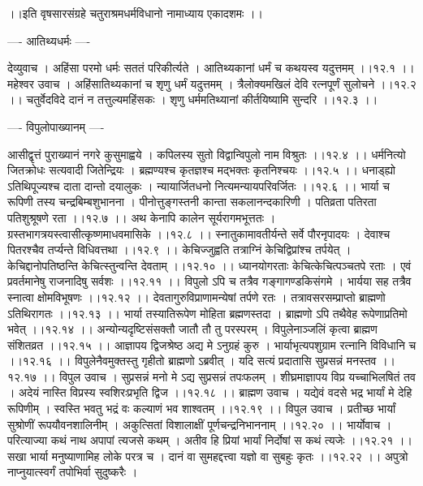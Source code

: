 \documentclass[11pt]{book}
\begin{document}
\begin{landscape}
 ।।इति वृषसारसंग्रहे चतुराश्रमधर्मविधानो नामाध्याय एकादशमः ।।





---- आतिथ्यधर्मः ---- 

देव्युवाच ।
अहिंसा परमो धर्मः सततं परिकीर्त्यते ।
आतिथ्यकानां धर्मं च कथयस्व यदुत्तमम् ।।१२.१ ।।
महेश्वर उवाच ।
अहिंसातिथ्यकानां च शृणु धर्मं यदुत्तमम् ।
त्रैलोक्यमखिलं देवि रत्नपूर्णं सुलोचने ।।१२.२ ।।
चतुर्वेदविदे दानं न तत्तुल्यमहिंसकः ।
शृणु धर्ममतिथ्यानां कीर्तयिष्यामि सुन्दरि ।।१२.३ ।।

---- विपुलोपाख्यानम् ----

आसीद्वृत्तं पुराख्यानं नगरे कुसुमाह्वये ।
कपिलस्य सुतो विद्वान्विपुलो नाम विश्रुतः ।।१२.४ ।।
धर्मनित्यो जितक्रोधः सत्यवादी जितेन्द्रियः ।
ब्रह्मण्यश्च कृतज्ञश्च मद्भक्तः कृतनिश्चयः ।।१२.५ ।।
धनाड्ह्यो ऽतिथिपूज्यश्च दाता दान्तो दयालुकः ।
न्यायार्जितधनो नित्यमन्यायपरिवर्जितः ।।१२.६ ।।
भार्या च रूपिणी तस्य चन्द्रबिम्बशुभानना ।
पीनोत्तुङ्गस्तनी कान्ता सकलानन्दकारिणी ।
पतिव्रता पतिरता पतिशुश्रूषणे रता ।।१२.७ ।।
अथ केनापि कालेन सूर्यरागमभूत्ततः ।
ग्रस्तभागत्रयस्त्वासीत्कृष्णमाधवमासिके ।।१२.८ ।।
स्नातुकामावतीर्यन्ते सर्वे पौरनृपादयः ।
देवाश्च पितरश्चैव तर्प्यन्ते विधिवत्तथा ।।१२.९ ।।
केचिज्जुह्वति तत्राग्निं केचिद्विप्रांश्च तर्पयेत् ।
केचिद्दानोपतिष्ठन्ति केचित्स्तुन्वन्ति देवताम् ।।१२.१० ।।
ध्यानयोगरताः केचित्केचित्पञ्चतपे रताः ।
एवं प्रवर्तमानेषु राजनादिषु सर्वशः ।।१२.११ ।।
विपुलो ऽपि च तत्रैव गङ्गागण्डकिसंगमे ।
भार्यया सह तत्रैव स्नात्वा क्षोमविभूषणः ।।१२.१२ ।।
देवतागुरुविप्राणामन्येषां तर्पणे रतः ।
तत्रावसरसम्प्राप्तो ब्राह्मणो ऽतिथिरागतः ।।१२.१३ ।।
भार्या तस्यातिरूपेण मोहिता ब्रह्मणस्तदा ।
ब्राह्मणो ऽपि तथैवेह रूपेणाप्रतिमो भवेत् ।।१२.१४ ।।
अन्योन्यदृष्टिसंसक्तौ जातौ तौ तु परस्परम् ।
विपुलेनाञ्जलिं कृत्वा ब्राह्मण संशितव्रत ।।१२.१५ ।।
आज्ञापय द्विजश्रेष्ठ अद्य मे ऽनुग्रहं कुरु ।
भार्याभृत्यपशुग्राम रत्नानि विविधानि च ।।१२.१६ ।।
विपुलेनैवमुक्तस्तु गृहीतो ब्राह्मणो ऽब्रवीत् ।
यदि सत्यं प्रदातासि सुप्रसन्नं मनस्तव ।।१२.१७ ।।
विपुल उवाच ।
सुप्रसन्नं मनो मे ऽद्य सुप्रसन्नं तपःफलम् ।
शीघ्रमाज्ञापय विप्र यच्चाभिलषितं तव ।
अदेयं नास्ति विप्रस्य स्वशिरःप्रभृति द्विज ।।१२.१८ ।।
ब्राह्मण उवाच ।
यद्येवं वदसे भद्र भार्यां मे देहि रूपिणीम् ।
स्वस्ति भवतु भद्रं वः कल्याणं भव शाश्वतम् ।।१२.१९ ।।
विपुल उवाच ।
प्रतीच्छ भार्यां सुश्रोणीं रूपयौवनशालिनीम् ।
अकुत्सितां विशालाक्षीं पूर्णचन्द्रनिभाननाम् ।।१२.२० ।।
भार्योवाच ।
परित्याज्या कथं नाथ अपापां त्यजसे कथम् ।
अतीव हि प्रियां भार्यां निर्दोषां स कथं त्यजेः ।।१२.२१ ।।
सखा भार्या मनुष्याणामिह लोके परत्र च ।
दानं वा सुमहद्दत्त्वा यज्ञो वा सुबहुः कृतः ।।१२.२२ ।।
अपुत्रो नाप्नुयात्स्वर्गं तपोभिर्वा सुदुष्करैः ।

\end{landscape}
\end{document}
